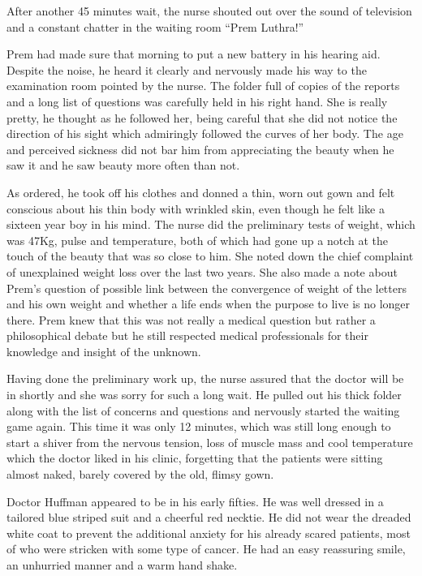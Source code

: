 After another 45 minutes wait, the nurse shouted out over the sound of
television and a constant chatter in the waiting room ``Prem Luthra!''

Prem had made sure that morning to put a new battery in his hearing aid.
Despite the noise, he heard it clearly and nervously made his way to the
examination room pointed by the nurse. The folder full of copies of the
reports and a long list of questions was carefully held in his right
hand. She is really pretty, he thought as he followed her, being careful
that she did not notice the direction of his sight which admiringly
followed the curves of her body. The age and perceived sickness did not
bar him from appreciating the beauty when he saw it and he saw beauty
more often than not.

As ordered, he took off his clothes and donned a thin, worn out gown and
felt conscious about his thin body with wrinkled skin, even though he
felt like a sixteen year boy in his mind. The nurse did the preliminary
tests of weight, which was 47Kg, pulse and temperature, both of which
had gone up a notch at the touch of the beauty that was so close to him.
She noted down the chief complaint of unexplained weight loss over the
last two years. She also made a note about Prem's question of possible
link between the convergence of weight of the letters and his own weight
and whether a life ends when the purpose to live is no longer there.
Prem knew that this was not really a medical question but rather a
philosophical debate but he still respected medical professionals for
their knowledge and insight of the unknown.

Having done the preliminary work up, the nurse assured that the doctor
will be in shortly and she was sorry for such a long wait. He pulled out
his thick folder along with the list of concerns and questions and
nervously started the waiting game again. This time it was only 12
minutes, which was still long enough to start a shiver from the nervous
tension, loss of muscle mass and cool temperature which the doctor liked
in his clinic, forgetting that the patients were sitting almost naked,
barely covered by the old, flimsy gown.

Doctor Huffman appeared to be in his early fifties. He was well dressed
in a tailored blue striped suit and a cheerful red necktie. He did not
wear the dreaded white coat to prevent the additional anxiety for his
already scared patients, most of who were stricken with some type of
cancer. He had an easy reassuring smile, an unhurried manner and a warm
hand shake.

